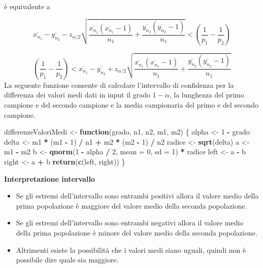\documentclass[]{book}
\newenvironment{Shaded}{\begin{snugshade}}{\end{snugshade}}
\newcommand{\KeywordTok}[1]{\textcolor[rgb]{0.13,0.29,0.53}{\textbf{#1}}}
\newcommand{\DataTypeTok}[1]{\textcolor[rgb]{0.13,0.29,0.53}{#1}}
\newcommand{\DecValTok}[1]{\textcolor[rgb]{0.00,0.00,0.81}{#1}}
\newcommand{\StringTok}[1]{\textcolor[rgb]{0.31,0.60,0.02}{#1}}
\newcommand{\ControlFlowTok}[1]{\textcolor[rgb]{0.13,0.29,0.53}{\textbf{#1}}}
\newcommand{\OperatorTok}[1]{\textcolor[rgb]{0.81,0.36,0.00}{\textbf{#1}}}
\newcommand{\NormalTok}[1]{#1}
\begin{document}
è equivalente a

\[ \overline{x_{n_1}} - \overline{y_{n_2}}  - z_{\alpha/2} \sqrt{\frac{\overline{x_{n_1}}(\overline{x_{n_1}} - 1)}{n_1} + \frac{\overline{y_{n_2}}(\overline{y_{n_2}} - 1)}{n_1}}<  \left( \frac{1}{p_1} - \frac{1}{p_2} \right)\]

\[ \left( \frac{1}{p_1} - \frac{1}{p_2} \right) < \overline{x_{n_1}} - \overline{y_{n_2}}  + z_{\alpha/2} \sqrt{\frac{\overline{x_{n_1}}(\overline{x_{n_1}} - 1)}{n_1} + \frac{\overline{y_{n_2}}(\overline{y_{n_2}} - 1)}{n_1}}\]
La seguente funzione consente di calcolare l'intervallo di confidenza
per la differenza dei valori medi dati in input il grado \(1-\alpha\),
la lunghezza del primo campione e del secondo campione e la media
campionaria del primo e del secondo campione.

\begin{Shaded}
\begin{Highlighting}[]
\NormalTok{differenzeValoriMedi <-}\StringTok{ }\ControlFlowTok{function}\NormalTok{(grado, n1, n2, m1, m2) \{}
\NormalTok{  alpha <-}\StringTok{ }\DecValTok{1} \OperatorTok{-}\StringTok{ }\NormalTok{grado}
\NormalTok{  delta <-}\StringTok{ }\NormalTok{m1 }\OperatorTok{*}\StringTok{ }\NormalTok{(m1 }\OperatorTok{-}\StringTok{ }\DecValTok{1}\NormalTok{) }\OperatorTok{/}\StringTok{ }\NormalTok{n1 }\OperatorTok{+}\StringTok{ }\NormalTok{m2 }\OperatorTok{*}\StringTok{ }\NormalTok{(m2 }\OperatorTok{-}\StringTok{ }\DecValTok{1}\NormalTok{) }\OperatorTok{/}\StringTok{ }\NormalTok{n2}
\NormalTok{  radice <-}\StringTok{ }\KeywordTok{sqrt}\NormalTok{(delta)}
\NormalTok{  a <-}\StringTok{ }\NormalTok{m1 }\OperatorTok{-}\StringTok{ }\NormalTok{m2}
\NormalTok{  b <-}\StringTok{ }\KeywordTok{qnorm}\NormalTok{(}\DecValTok{1} \OperatorTok{-}\StringTok{ }\NormalTok{alpha }\OperatorTok{/}\StringTok{ }\DecValTok{2}\NormalTok{, }\DataTypeTok{mean =} \DecValTok{0}\NormalTok{, }\DataTypeTok{sd =} \DecValTok{1}\NormalTok{) }\OperatorTok{*}\StringTok{ }\NormalTok{radice}
\NormalTok{  left <-}\StringTok{  }\NormalTok{a }\OperatorTok{-}\StringTok{ }\NormalTok{b}
\NormalTok{  right <-}\StringTok{ }\NormalTok{a }\OperatorTok{+}\StringTok{ }\NormalTok{b}
  \KeywordTok{return}\NormalTok{(}\KeywordTok{c}\NormalTok{(left, right))}
\NormalTok{\}}
\end{Highlighting}
\end{Shaded}

\textbf{Interpretazione intervallo}

\begin{itemize}
\item
  Se gli estremi dell'intervallo sono entrambi positivi allora il valore
  medio della prima popolazione è maggiore del valore medio della
  seconda popolazione.
\item
  Se gli estremi dell'intervallo sono entrambi negativi allora il valore
  medio della prima popolazione è minore del valore medio della seconda
  popolazione.
\item
  Altrimenti esiste la possibilità che i valori medi siano uguali,
  quindi non è possibile dire quale sia maggiore.
\end{itemize}
\end{document}
